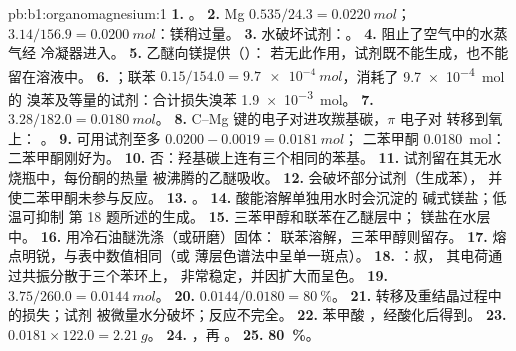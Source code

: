 \begin{solution}{pb:b1:organomagnesium:1}
\textbf{1.} 。
\textbf{2.} Mg $0.535/24.3 = \qty{0.0220}{mol}$； $3.14/156.9 =
\qty{0.0200}{mol}$：镁稍过量。
\textbf{3.} 水破坏试剂：。
\textbf{4.} 阻止了空气中的水蒸气经
冷凝器进入。
\textbf{5.} 乙醚向镁提供（）：
若无此作用，试剂既不能生成，也不能留在溶液中。
\textbf{6.} ；联苯
$0.15/154.0 = \qty{9.7e-4}{mol}$，消耗了 \qty{9.7e-4}{mol} 的
溴苯及等量的试剂：合计损失溴苯
\qty{1.9e-3}{mol}。
\textbf{7.} $3.28/182.0 = \qty{0.0180}{mol}$。
\textbf{8.} C--Mg 键的电子对进攻羰基碳，$\pi$ 电子对
转移到氧上： 。
\textbf{9.} 可用试剂至多 $0.0200 - 0.0019 = \qty{0.0181}{mol}$；
二苯甲酮 \qty{0.0180}{mol}：二苯甲酮刚好为。
\textbf{10.} 否：羟基碳上连有三个相同的苯基。
\textbf{11.} 试剂留在其无水烧瓶中，每份酮的热量
被沸腾的乙醚吸收。
\textbf{12.} 会破坏部分试剂（生成苯），
并使二苯甲酮未参与反应。
\textbf{13.} 。
\textbf{14.} 酸能溶解单独用水时会沉淀的
碱式镁盐；低温可抑制
第 18 题所述的生成。
\textbf{15.} 三苯甲醇和联苯在乙醚层中；
镁盐在水层中。
\textbf{16.} 用冷石油醚洗涤（或研磨）固体：
联苯溶解，三苯甲醇则留存。
\textbf{17.} 熔点明锐，与表中数值相同（或
薄层色谱法中呈单一斑点）。
\textbf{18.} ：叔，
其电荷通过共振分散于三个苯环上，
非常稳定，并因扩大而呈色。
\textbf{19.} $3.75/260.0 = \qty{0.0144}{mol}$。
\textbf{20.} $0.0144/0.0180 = \qty{80}{\percent}$。
\textbf{21.} 转移及重结晶过程中的损失；试剂
被微量水分破坏；反应不完全。
\textbf{22.} 苯甲酸 ，经酸化后得到。
\textbf{23.} $0.0181 \times 122.0 = \qty{2.21}{g}$。
\textbf{24.} ，再
。
\textbf{25.} \textbf{\qty{80}{\percent}}。
\end{solution}
